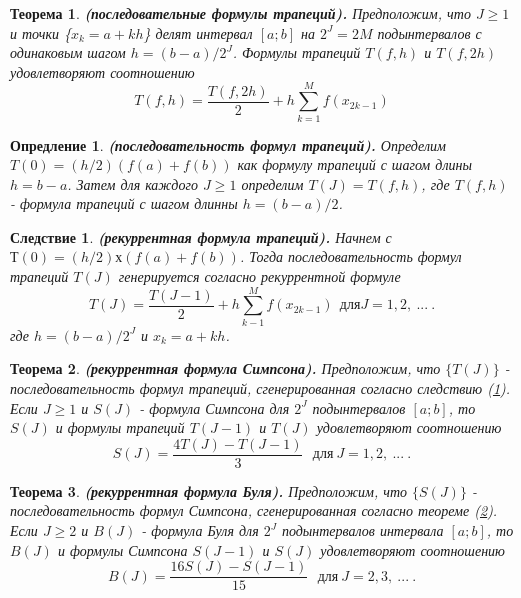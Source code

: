 \documentclass[14pt, titlepage, a4paper]{extarticle} %
\newtheorem{theorem}{Теорема}
\newtheorem{definition}{Опредление}
\newtheorem{corollary}{Следствие}
\begin{document}
	\begin{theorem}\label{th:7.4}
		\textbf{(последовательные формулы трапеций).} Предположим, что $J \geqslant 1$ и точки \{$x_k = a + kh$\} делят интервал $\left[a; b\right]$ на $2^J = 2M$ подынтервалов с одинаковым шагом $h = (b-a)/2^J$. Формулы трапеций $T(f,h)$ и $T(f,2h)$ удовлетворяют соотношению
		\begin{equation}\label{eq:1}
			T(f,h)=\frac{T(f,2h)}{2} + h\sum_{k=1}^{M}f(x_{2k-1})
		\end{equation}
	\end{theorem}
	
	\begin{definition}\label{df:7.3}
		\textbf{(последовательность формул трапеций).} Определим $T(0) = (h/2)(f(a)+f(b))$ как формулу трапеций с шагом длины $h = b - a$. Затем для каждого $J\ge1$ определим $T(J)=T(f,h)$, где $T(f,h)$ - формула трапеций с шагом длинны $h = (b-a)/2$.
	\end{definition}
	
	\begin{corollary}\label{cr:7.4}
	\textbf{(рекуррентная формула трапеций).} Начнем с $Т(0) = (h/2) х (f(a) + f(b))$. Тогда последовательность формул трапеций ${T(J)}$ генерируется согласно рекуррентной формуле
		\begin{equation}\label{eq:2}
			T(J) = \frac{T(J-1)}{2}+ h\sum_{k-1}^{M}f(x_{2k-1})~~\text{для} J = 1, 2,~...~.
		\end{equation}
	где $h=(b-a)/2^J$ и ${x_k = a + kh}$.
	\end{corollary}
	
	
	\begin{theorem}\label{th:7.5}
		\textbf{(рекуррентная формула Симпсона).} Предположим, что $\{T(J)\}$ - последовательность формул трапеций, сгенерированная согласно следствию (\ref{cr:7.4}). Если $J\ge1$ и $S(J)$ - формула Симпсона для $2^J$ подынтервалов $[a;b]$, то $S(J)$ и формулы трапеций $T(J-1)$ и $T(J)$ удовлетворяют соотношению
		\begin{equation}\label{eq:7}
			S(J) = \frac{4T(J)-T(J-1)}{3}~~~\text{для}~J = 1,2,~...~.
		\end{equation}
	\end{theorem}
	
	
	\begin{theorem}\label{th:7.6}
		\textbf{(рекуррентная формула Буля).} Предположим, что $\{S(J)\}$ - последовательность формул Симпсона, сгенерированная согласно теореме (\ref{th:7.5}). Если $J\ge2$ и $B(J)$ - формула Буля для $2^J$ подынтервалов интервала $[a;b]$, то $B(J)$ и формулы Симпсона $S(J-1)$ и $S(J)$ удовлетворяют соотношению
		\begin{equation}\label{eq:14}
			B(J) = \frac{16S(J)-S(J-1)}{15}~~~\text{для}~J=2,3,~...~.
		\end{equation}
	\end{theorem}
	
\end{document}
